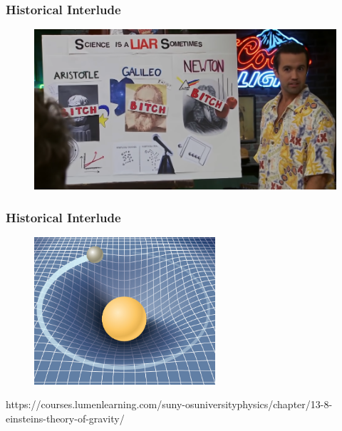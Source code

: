 \documentclass{beamer}
\begin{document}
\begin{frame}
\frametitle{Historical Interlude}

  \begin{figure}[htb!]
    \centering
    \includegraphics[width=\textwidth]{fig.macEvolution.png}
  \end{figure}

\end{frame}

\begin{frame}
\frametitle{Historical Interlude}

  \begin{figure}[htb!]
    \centering
    \includegraphics[width=0.6\textwidth]{fig.Einstein.jpg}
  \end{figure}
https://courses.lumenlearning.com/suny-osuniversityphysics/chapter/13-8-einsteins-theory-of-gravity/

\end{frame}
\end{document}
